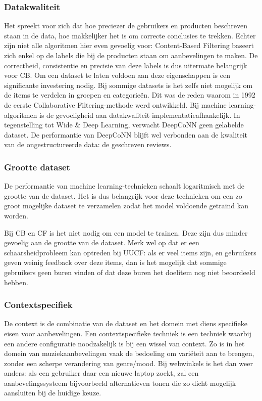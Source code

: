 \subsubsection{Datakwaliteit}
Het spreekt voor zich dat hoe preciezer de gebruikers en producten beschreven staan in de data, hoe makkelijker het is om correcte conclusies te trekken. Echter zijn niet alle algoritmen hier even gevoelig voor: Content-Based Filtering baseert zich enkel op de labels die bij de producten staan om aanbevelingen te maken. De correctheid, consistentie en precisie van deze labels is dus uitermate belangrijk voor CB. Om een dataset te laten voldoen aan deze eigenschappen is een significante investering nodig. Bij sommige datasets is het zelfs niet mogelijk om de items te verdelen in groepen en categorieën. Dit was de reden waarom in 1992 de eerste Collaborative Filtering-methode werd ontwikkeld. \cite{UUCF_original_paper} Bij machine learning-algoritmen is de gevoeligheid aan datakwaliteit implementatieafhankelijk. In tegenstelling tot Wide \& Deep Learning, verwacht DeepCoNN geen gelabelde dataset. De performantie van DeepCoNN blijft wel verbonden aan de kwaliteit van de ongestructureerde data: de geschreven reviews.
\subsubsection{Grootte dataset}
De performantie van machine learning-technieken schaalt logaritmisch met de grootte van de dataset. \cite{dataset_size_for_deep_learning} Het is dus belangrijk voor deze technieken om een zo groot mogelijke dataset te verzamelen zodat het model voldoende getraind kan worden.

Bij CB en CF is het niet nodig om een model te trainen. Deze zijn dus minder gevoelig aan de grootte van de dataset. Merk wel op dat er een schaarsheidprobleem kan optreden bij UUCF: als er veel items zijn, en gebruikers geven weinig feedback over deze items, dan is het mogelijk dat sommige gebruikers geen buren vinden of dat deze buren het doelitem nog niet beoordeeld hebben. \cite{cursus_hs9}
\subsubsection{Contextspecifiek}
De context is de combinatie van de dataset en het domein met diens specifieke eisen voor aanbevelingen. Een contextspecifieke techniek is een techniek waarbij een andere configuratie noodzakelijk is bij een wissel van context. Zo is in het domein van muziekaanbevelingen vaak de bedoeling om variëteit aan te brengen, zonder een scherpe verandering van genre/mood. Bij webwinkels is het dan weer anders: als een gebruiker daar een nieuwe laptop zoekt, zal een aanbevelingssysteem bijvoorbeeld alternatieven tonen die zo dicht mogelijk aansluiten bij de huidige keuze.

